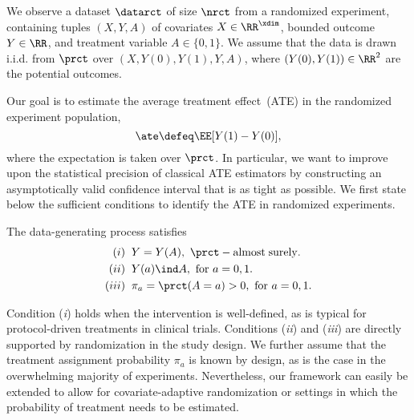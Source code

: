 We observe a dataset $\datarct$ of size $\nrct$ from a randomized experiment, containing tuples $(X,Y,A)$ of covariates $X \in \RR^\xdim$, bounded outcome $Y\in \RR$, and treatment variable $A \in \{0,1\}$. We assume that the data is drawn i.i.d. from  $\prct$ over $\left(X, Y(0), Y(1), Y,A\right)$, where $\left(Y(0), Y(1)\right) \in \RR^2$ are the potential outcomes.

Our goal is to estimate the average treatment effect~(ATE) in the randomized experiment population, 
$$
\ate \defeq \EE[Y(1) - Y(0)],
$$ where the expectation is taken over $\prct$. 
In particular, we want to improve upon the statistical precision of classical ATE estimators by constructing an asymptotically valid confidence interval that is as tight as possible. We first state below the sufficient conditions to identify the ATE in randomized experiments.
\begin{assumption}
\label{asm:internalvalid}
The data-generating process satisfies
 \begin{align*}
(i)&\;\;   Y = Y(A),~ \prct -\mathrm{almost\;surely}. \\
(ii)&\;\;Y(a) \ind A,~\mathrm{for}~a =0,1. \\
(iii)& \;\; \pi_a = \prct(A =a) > 0,~\mathrm{for}~a =0,1.
 \end{align*}
\end{assumption} 
Condition (\textit{i}) holds when the intervention is well-defined, as is typical for protocol-driven treatments in clinical trials. Conditions (\textit{ii}) and (\textit{iii}) are directly supported by randomization in the study design. We further assume that the treatment assignment probability $\pi_a$ is known by design, as is the case in the overwhelming majority of experiments. Nevertheless,  our framework can easily be extended to allow for covariate-adaptive randomization or settings in which the probability of treatment needs to be estimated.

